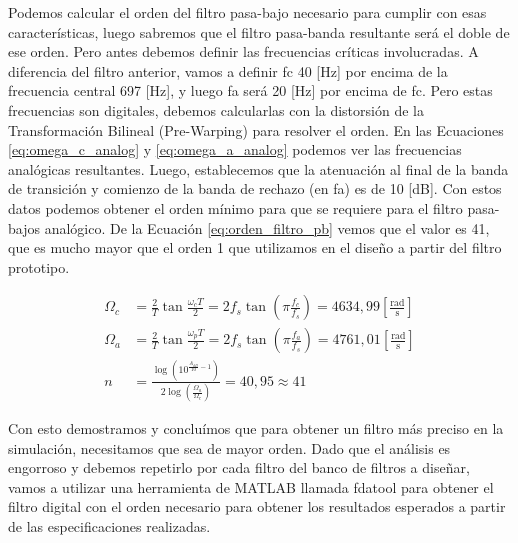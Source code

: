 Podemos calcular el orden del filtro pasa-bajo necesario para cumplir con esas características, luego sabremos que el filtro pasa-banda resultante será el doble de ese orden. Pero antes debemos definir las frecuencias críticas involucradas. A diferencia del filtro anterior, vamos a definir \gls{fc} 40 [Hz] por encima de la frecuencia central 697 [Hz], y luego \gls{fa} será 20 [Hz] por encima de \gls{fc}. Pero estas frecuencias son digitales, debemos calcularlas con la distorsión de la Transformación Bilineal (Pre-Warping) para resolver el orden. En las Ecuaciones \ref{eq:omega_c_analog} y \ref{eq:omega_a_analog} podemos ver las frecuencias analógicas resultantes. Luego, establecemos que la atenuación al final de la banda de transición y comienzo de la banda de rechazo (en \gls{fa}) es de 10 [dB]. Con estos datos podemos obtener el orden mínimo para que se requiere para el filtro pasa-bajos analógico. De la Ecuación \ref{eq:orden_filtro_pb} vemos que el valor es 41, que es mucho mayor que el orden 1 que utilizamos en el diseño a partir del filtro prototipo.

\begin{align}
  \Omega_c & = \frac{2}{T} \tan \frac{\omega_c T}{2} = 2 f_s \tan\left(\pi \frac{f_c}{f_s}\right) = 4634,99 \mathrm{\left[\frac{rad}{s}\right]} \label{eq:omega_c_analog} \\
  \Omega_a & = \frac{2}{T} \tan \frac{\omega_p T}{2} = 2 f_s \tan\left(\pi \frac{f_a}{f_s}\right) = 4761,01 \mathrm{\left[\frac{rad}{s}\right]} \label{eq:omega_a_analog} \\
  n        & = \frac{\log\left(10^{\frac{A_{dB}}{10}-1}\right)}{2\log\left(\frac{\Omega_a}{\Omega_c}\right)} = 40,95 \approx 41 \label{eq:orden_filtro_pb}
\end{align}

Con esto demostramos y concluímos que para obtener un filtro más preciso en la simulación, necesitamos que sea de mayor orden. Dado que el análisis es engorroso y debemos repetirlo por cada filtro del banco de filtros a diseñar, vamos a utilizar una herramienta de MATLAB llamada fdatool para obtener el filtro digital con el orden necesario para obtener los resultados esperados a partir de las especificaciones realizadas.
